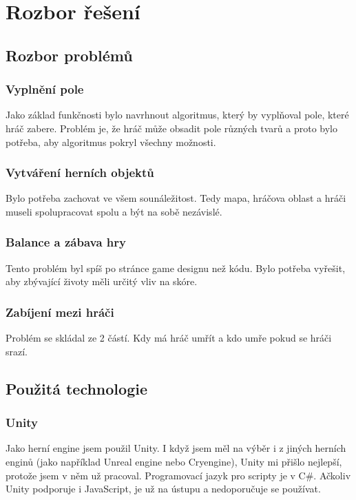\documentclass[12pt,a4paper]{report}
\begin{document}
\chapter{Rozbor řešení}
\section{Rozbor problémů}
\subsection{Vyplnění pole}
Jako základ funkčnosti bylo navrhnout algoritmus, který by vyplňoval pole, které hráč zabere.
Problém je, že hráč může obsadit pole různých tvarů a proto bylo potřeba, aby algoritmus pokryl všechny možnosti.
\subsection{Vytváření herních objektů}
Bylo potřeba zachovat ve všem sounáležitost.
Tedy mapa, hráčova oblast a hráči museli spolupracovat spolu a být na sobě nezávislé.
\subsection{Balance a zábava hry}
Tento problém byl spíš po stránce game designu než kódu.
Bylo potřeba vyřešit, aby zbývající životy měli určitý vliv na skóre.
\subsection{Zabíjení mezi hráči}
Problém se skládal ze 2 částí. Kdy má hráč umřít a kdo umře pokud se hráči srazí.
\section{Použitá technologie}
\subsection{Unity}
Jako herní engine jsem použil Unity.
I když jsem měl na výběr i z jiných herních enginů (jako například Unreal engine nebo Cryengine),
Unity mi přišlo nejlepší, protože jsem v něm už pracoval.
Programovací jazyk pro scripty je v C\#.
Ačkoliv Unity podporuje i JavaScript, je už na ústupu a nedoporučuje se používat.
\newpage
\end{document}
